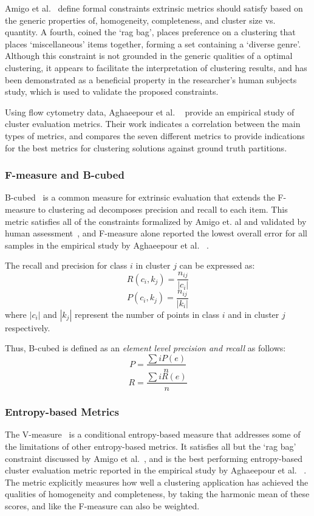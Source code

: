 Amigo et al.~\cite{Amigo} define formal constraints extrinsic metrics should satisfy based on the generic properties of, homogeneity, completeness, and cluster size vs. quantity.  A fourth, coined the `rag bag', places preference on a clustering that places `miscellaneous' items together, forming a set containing a `diverse genre'.  Although this constraint is not grounded in the generic qualities of a optimal clustering, it appears to facilitate the interpretation of clustering results, and has been demonstrated as a beneficial property in the researcher's human subjects study, which is used to validate the proposed constraints.

Using flow cytometry data, Aghaeepour et al. ~\cite{Aghaeepour} provide an empirical study of cluster evaluation metrics.  Their work indicates a correlation between the main types of metrics, and compares the seven different metrics to provide indications for the best metrics for clustering solutions against ground truth partitions.

\subsubsection{F-measure and B-cubed}
 B-cubed~\cite{Bagga} is a common measure for extrinsic evaluation that extends the F-measure to clustering ad decomposes precision and recall to each item.  This metric satisfies all of the constraints formalized by Amigo et. al and validated by human assessment~\cite{Amigo}, and F-measure alone reported the lowest overall error for all samples in the empirical study by Aghaeepour et al. ~\cite{Aghaeepour}.
 
The recall and precision for class $i$ in cluster $j$ can be expressed as:
$$R(c_{i},k_{j})=\frac{n_{ij}}{|c_{i}|}$$
$$P(c_{i},k_{j})=\frac{n_{ij}}{|k_{i}|}$$
\noindent where ${|c_{i}|}$ and ${|k_{j}|}$ represent the number of points in class $i$ and in cluster $j$ respectively.

Thus, B-cubed is defined as an \emph{element level precision and recall} as follows:
$$P=\frac{\sum{i}P(e)}{n}$$
$$R=\frac{\sum{i}R(e)}{n}$$

\subsubsection{Entropy-based Metrics}
The V-measure~\cite{Rosenberg} is a conditional entropy-based measure that addresses some of the limitations of other entropy-based metrics.  It satisfies all but the `rag bag' constraint discussed by Amigo et al.~\cite{Amigo}, and is the best performing entropy-based cluster evaluation metric reported in the empirical study by Aghaeepour et al. ~\cite{Aghaeepour}.  The metric explicitly measures how well a clustering application has achieved the qualities of homogeneity and completeness, by taking the harmonic mean of these scores, and like the F-measure can also be weighted.  

